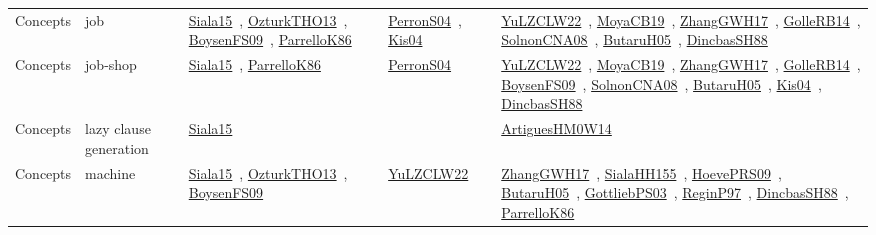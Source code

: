 {\begin{longtable}{lp{3cm}>{\raggedright\arraybackslash}p{6cm}>{\raggedright\arraybackslash}p{6cm}>{\raggedright\arraybackslash}p{8cm}}
Concepts & job & \href{../cars/works/Siala15.pdf}{Siala15}~\cite{Siala15}, \href{../cars/works/OzturkTHO13.pdf}{OzturkTHO13}~\cite{OzturkTHO13}, \href{../cars/works/BoysenFS09.pdf}{BoysenFS09}~\cite{BoysenFS09}, \href{../cars/works/ParrelloK86.pdf}{ParrelloK86}~\cite{ParrelloK86} & \href{../cars/works/PerronS04.pdf}{PerronS04}~\cite{PerronS04}, \href{../cars/works/Kis04.pdf}{Kis04}~\cite{Kis04} & \href{../cars/works/YuLZCLW22.pdf}{YuLZCLW22}~\cite{YuLZCLW22}, \href{../cars/works/MoyaCB19.pdf}{MoyaCB19}~\cite{MoyaCB19}, \href{../cars/works/ZhangGWH17.pdf}{ZhangGWH17}~\cite{ZhangGWH17}, \href{../cars/works/GolleRB14.pdf}{GolleRB14}~\cite{GolleRB14}, \href{../cars/works/SolnonCNA08.pdf}{SolnonCNA08}~\cite{SolnonCNA08}, \href{../cars/works/ButaruH05.pdf}{ButaruH05}~\cite{ButaruH05}, \href{../cars/works/DincbasSH88.pdf}{DincbasSH88}~\cite{DincbasSH88}\\
Concepts & job-shop & \href{../cars/works/Siala15.pdf}{Siala15}~\cite{Siala15}, \href{../cars/works/ParrelloK86.pdf}{ParrelloK86}~\cite{ParrelloK86} & \href{../cars/works/PerronS04.pdf}{PerronS04}~\cite{PerronS04} & \href{../cars/works/YuLZCLW22.pdf}{YuLZCLW22}~\cite{YuLZCLW22}, \href{../cars/works/MoyaCB19.pdf}{MoyaCB19}~\cite{MoyaCB19}, \href{../cars/works/ZhangGWH17.pdf}{ZhangGWH17}~\cite{ZhangGWH17}, \href{../cars/works/GolleRB14.pdf}{GolleRB14}~\cite{GolleRB14}, \href{../cars/works/BoysenFS09.pdf}{BoysenFS09}~\cite{BoysenFS09}, \href{../cars/works/SolnonCNA08.pdf}{SolnonCNA08}~\cite{SolnonCNA08}, \href{../cars/works/ButaruH05.pdf}{ButaruH05}~\cite{ButaruH05}, \href{../cars/works/Kis04.pdf}{Kis04}~\cite{Kis04}, \href{../cars/works/DincbasSH88.pdf}{DincbasSH88}~\cite{DincbasSH88}\\
Concepts & lazy clause generation & \href{../cars/works/Siala15.pdf}{Siala15}~\cite{Siala15} &  & \href{../cars/works/ArtiguesHM0W14.pdf}{ArtiguesHM0W14}~\cite{ArtiguesHM0W14}\\
Concepts & machine & \href{../cars/works/Siala15.pdf}{Siala15}~\cite{Siala15}, \href{../cars/works/OzturkTHO13.pdf}{OzturkTHO13}~\cite{OzturkTHO13}, \href{../cars/works/BoysenFS09.pdf}{BoysenFS09}~\cite{BoysenFS09} & \href{../cars/works/YuLZCLW22.pdf}{YuLZCLW22}~\cite{YuLZCLW22} & \href{../cars/works/ZhangGWH17.pdf}{ZhangGWH17}~\cite{ZhangGWH17}, \href{../cars/works/SialaHH155.pdf}{SialaHH155}~\cite{SialaHH155}, \href{../cars/works/HoevePRS09.pdf}{HoevePRS09}~\cite{HoevePRS09}, \href{../cars/works/ButaruH05.pdf}{ButaruH05}~\cite{ButaruH05}, \href{../cars/works/GottliebPS03.pdf}{GottliebPS03}~\cite{GottliebPS03}, \href{../cars/works/ReginP97.pdf}{ReginP97}~\cite{ReginP97}, \href{../cars/works/DincbasSH88.pdf}{DincbasSH88}~\cite{DincbasSH88}, \href{../cars/works/ParrelloK86.pdf}{ParrelloK86}~\cite{ParrelloK86}\\

\end{longtable}}

